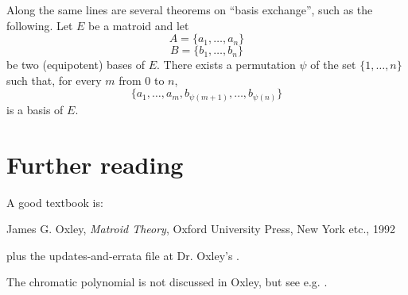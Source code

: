 \documentclass[12pt]{article}
\begin{document}
Along the same lines are several theorems on ``basis exchange'', such as
the following.
Let $E$ be a matroid and let
$$A=\{a_1,\ldots,a_n\}$$
$$B=\{b_1,\ldots,b_n\}$$
be two (equipotent) bases of $E$.
There exists a permutation $\psi$ of the set
$\{1,\ldots,n\}$ such that, for every $m$ from $0$ to $n$,
$$\{a_1,\ldots,a_m,b_{\psi(m+1)},\ldots,b_{\psi(n)}\}$$
is a basis of $E$.

\section{Further reading}
A good textbook is:

James G. Oxley, \emph{Matroid Theory},
Oxford University Press, New York etc., 1992

plus the updates-and-errata file at Dr. Oxley's
.

The chromatic polynomial is not discussed in Oxley, but see e.g.
.
\end{document}
